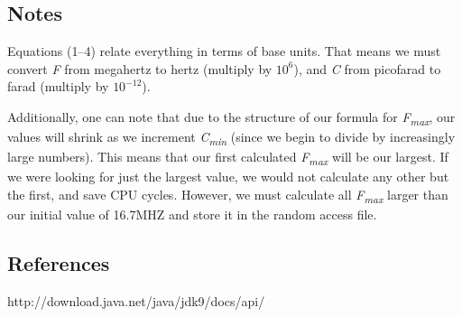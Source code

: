 \documentclass[12pt]{article}
\begin{document}
\newpage %



\begin{center}
\section{Notes}
\end{center}
Equations (1--4) relate everything in terms of base units. That means we must convert \textit{F} from megahertz to hertz (multiply by $10^6$), and \textit{C} from picofarad to farad (multiply by $10^{-12}$).
\par %
Additionally, one can note that due to the structure of our formula for \textit{F\textsubscript{max}}, our values will shrink as we increment \textit{C\textsubscript{min}} (since we begin to divide by increasingly large numbers). This means that our first calculated  \textit{F\textsubscript{max}} will be our largest. If we were looking for just the largest value, we would not calculate any other but the first, and save CPU cycles. However, we must calculate all \textit{F\textsubscript{max}} larger than our initial value of 16.7MHZ and store it in the random access file.



\newpage %


\begin{center}
\section{References}
\end{center}
http://download.java.net/java/jdk9/docs/api/
\end{document}
